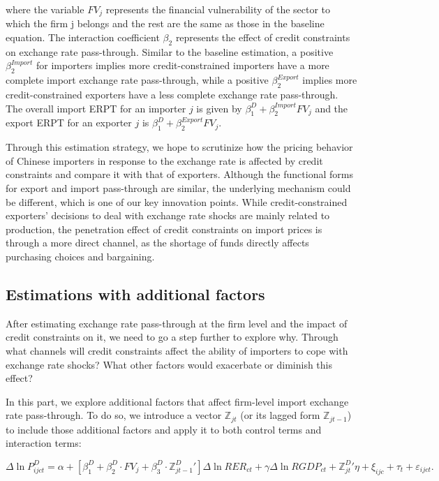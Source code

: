 where the variable $FV_{j}$ represents the financial vulnerability of the sector to which the firm j belongs and the rest are the same as those in the baseline equation. The interaction coefficient $\beta_2$ represents the effect of credit constraints on exchange rate pass-through. Similar to the baseline estimation, a positive $\beta^{Import}_2$ for importers implies more credit-constrained importers have a more complete import exchange rate pass-through, while a positive $\beta^{Export}_2$ implies more credit-constrained exporters have a less complete exchange rate pass-through. The overall import ERPT for an importer $j$ is given by $\beta^D_{1} +\beta^{Import}_{2} FV_j$ and the export ERPT for an exporter $j$ is  $\beta^D_{1} +\beta^{Export}_{2} FV_j$.

Through this estimation strategy, we hope to scrutinize how the pricing behavior of Chinese importers in response to the exchange rate is affected by credit constraints and compare it with that of exporters. Although the functional forms for export and import pass-through are similar, the underlying mechanism could be different, which is one of our key innovation points. While credit-constrained exporters’ decisions to deal with exchange rate shocks are mainly related to production, the penetration effect of credit constraints on import prices is through a more direct channel, as the shortage of funds directly affects purchasing choices and bargaining.

\subsection{Estimations with additional factors}\label{sec-4.1.3}

After estimating exchange rate pass-through at the firm level and the impact of credit constraints on it, we need to go a step further to explore why. Through what channels will credit constraints affect the ability of importers to cope with exchange rate shocks? What other factors would exacerbate or diminish this effect?

In this part, we explore additional factors that affect firm-level import exchange rate pass-through. To do so, we introduce a vector $\mathbb{Z}_{jt}$ (or its lagged form $\mathbb{Z}_{jt-1}$) to include those additional factors and apply it to both control terms and interaction terms: 

\begin{equation}
	\Delta \ln P^{D}_{ijct}=\alpha+[\beta^D_{1}+ \beta^D_{2} \cdot FV_{j}+\beta^D_{3} \cdot {\mathbb{Z}^{D}_{jt-1}}'] \Delta \ln RER_{ct} +\gamma \Delta \ln RGDP_{ct}+ {\mathbb{Z}^{D}_{jt}}' \eta+\xi_{ijc}+\tau_{t} +\varepsilon_{ijct}.
	\label{eq4.3}
\end{equation}

